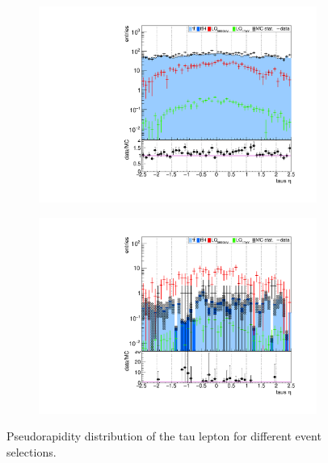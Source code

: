\begin{figure}
\begin{subfigure}[t]{0.49\textwidth}
                \label{taueta:2b2tau}
                \end{subfigure}
                \begin{subfigure}[t]{0.49\textwidth}
                \includegraphics[width=\textwidth]{figures/plots/kinLQ75/tau_eta_2j1b_1tau.pdf}
                \label{taueta:1b1tau}
                \end{subfigure}
                \begin{subfigure}[t]{0.49\textwidth}
                \includegraphics[width=\textwidth]{figures/plots/kinLQ75/tau_eta_2j1b_2tau.pdf}
                \label{taueta:1b2tau}
                \end{subfigure}
\caption[Pseudorapidity distribution of the tau lepton for different event selections.]{Pseudorapidity distribution of the tau lepton for different event selections.}
\label{taueta}
\end{figure}
